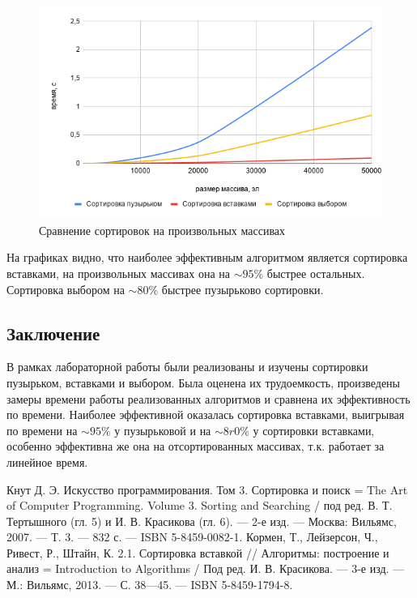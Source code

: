 \documentclass[a4paper,12pt]{article}
\begin{document}
\begin{center}
    \begin{figure}[H]	
	{
		\centering
		\includegraphics[scale=0.7]{chart2.png}
		\caption{\label{ris:cmp_r_and_m}Сравнение сортировок на произвольных массивах}        					
	}
	\end{figure}
	\end{center}

	На графиках видно, что наиболее эффективным алгоритмом является сортировка вставками, на произвольных массивах она на $\sim95\%$ быстрее остальных. Сортировка выбором на $\sim80\%$ быстрее пузырьково сортировки.

    \newpage

    \begin{center}
        \section*{Заключение}
    \end{center}
            \label{sec:ending}
        	\qquad В рамках лабораторной работы были реализованы и изучены сортировки пузырьком, вставками и выбором. Была оценена их трудоемкость, произведены замеры времени работы реализованных алгоритмов и сравнена их эффективность по времени. Наиболее эффективной оказалась сортировка вставками, выигрывая по времени на $\sim95\%$ у пузырьковой и на $\sim8r0\%$ у сортировки вставками, особенно эффективна же она на отсортированных массивах, т.к. работает за линейное время.

    \newpage

    \begin{center}        
        \begin{thebibliography}{}
        	  Кнут Д. Э. Искусство программирования. Том 3. Сортировка и поиск = The Art of Computer Programming. Volume 3. Sorting and Searching / под ред. В. Т. Тертышного (гл. 5) и И. В. Красикова (гл. 6). — 2-е изд. — Москва: Вильямс, 2007. — Т. 3. — 832 с. — ISBN 5-8459-0082-1.
        	 Кормен, Т., Лейзерсон, Ч., Ривест, Р., Штайн, К. 2.1. Сортировка вставкой // Алгоритмы: построение и анализ = Introduction to Algorithms / Под ред. И. В. Красикова. — 3-е изд. — М.: Вильямс, 2013. — С. 38—45. — ISBN 5-8459-1794-8.
        \end{thebibliography}
    \end{center}
\end{document}
